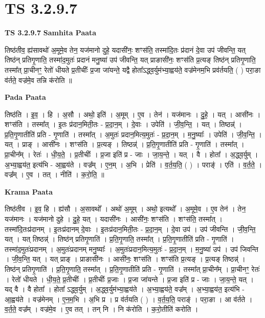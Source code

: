 \documentclass[17pt]{extarticle}
\begin{document}
\section{ TS 3.2.9.7 }

\textbf{TS 3.2.9.7 } \newline
\textbf{Samhita Paata} \newline

तिष्ठ॑तीव॒ ह्य॑सावथो॑ अ॒मूमे॒व तेन॒ यज॑मानो दुहे॒ यदासी॑नः॒ शꣳस॑ति॒ तस्मा॑दि॒तः प्र॑दानं दे॒वा उप॑ जीवन्ति॒ यत् तिष्ठ॑न् प्रतिगृ॒णाति॒ तस्मा॑द॒मुतः॑ प्रदानं मनु॒ष्या॑ उप॑ जीवन्ति॒ यत् प्राङासी॑नः॒ शꣳस॑ति प्र॒त्यङ् तिष्ठ॑न् प्रतिगृ॒णाति॒ तस्मा᳚त् प्रा॒चीनꣳ॒॒ रेतो॑ धीयते प्र॒तीचीः᳚ प्र॒जा जा॑यन्ते॒ यद्वै होता᳚ऽद्ध्व॒र्युम॑भ्या॒ह्वय॑ते॒ वज्र॑मेनम॒भि प्रव॑र्तयति॒ ( ) परा॒ङा व॑र्तते॒ वज्र॑मे॒व तन्नि क॑रोति ॥ \newline

\textbf{Pada Paata} \newline

तिष्ठ॑ति । इ॒व॒ । हि । अ॒सौ । अथो॒ इति॑ । अ॒मूम् । ए॒व । तेन॑ । यज॑मानः । दु॒हे॒ । यत् । आसी॑नः । शꣳस॑ति । तस्मा᳚त् । इ॒तः प्र॑दान॒मिती॒तः - प्र॒दा॒न॒म् । दे॒वाः । उपेति॑ । जी॒व॒न्ति॒ । यत् । तिष्ठन्न्॑ । प्र॒ति॒गृ॒णातीति॑ प्रति - गृ॒णाति॑ । तस्मा᳚त् । अ॒मुतः॑ प्रदान॒मित्य॒मुतः॑ - प्र॒दा॒न॒म् । म॒नु॒ष्याः᳚ । उपेति॑ । जी॒व॒न्ति॒ । यत् । प्राङ् । आसी॑नः । शꣳस॑ति । प्र॒त्यङ् । तिष्ठन्न्॑ । प्र॒ति॒गृ॒णातीति॑ प्रति - गृ॒णाति॑ । तस्मा᳚त् । प्रा॒चीन᳚म् । रेतः॑ । धी॒य॒ते॒ । प्र॒तीचीः᳚ । प्र॒जा इति॑ प्र - जाः । जा॒य॒न्ते॒ । यत् । वै । होता᳚ । अ॒द्ध्व॒र्युम् । अ॒भ्या॒ह्वय॑त॒ इत्य॑भि - आ॒ह्वय॑ते । वज्र᳚म् । ए॒न॒म् । अ॒भि । प्रेति॑ । व॒र्त॒य॒ति॒ ( ) । पराङ्॑ । एति॑ । व॒र्त॒ते॒ । वज्र᳚म् । ए॒व । तत् । नीति॑ । क॒रो॒ति॒ ॥  \newline


\textbf{Krama Paata} \newline

तिष्ठ॑तीव । इ॒व॒ हि । ह्य॑सौ । अ॒सावथो᳚ । अथो॑ अ॒मूम् । अथो॒ इत्यथो᳚ । अ॒मूमे॒व । ए॒व तेन॑ । तेन॒ यज॑मानः । यज॑मानो दुहे । दु॒हे॒ यत् । यदासी॑नः । आसी॑नः॒ शꣳस॑ति । शꣳस॑ति॒ तस्मा᳚त् । तस्मा॑दि॒तःप्र॑दानम् । इ॒तःप्र॑दानम् दे॒वाः । इ॒तःप्र॑दान॒मिती॒तः - प्र॒दा॒न॒म् । दे॒वा उप॑ । उप॑ जीवन्ति । जी॒व॒न्ति॒ यत् । यत् तिष्ठन्न्॑ । तिष्ठ॑न् प्रतिगृ॒णाति॑ । प्र॒ति॒गृ॒णाति॒ तस्मा᳚त् । प्र॒ति॒गृ॒णातीति॑ प्रति - गृ॒णाति॑ । तस्मा॑द॒मुतः॑प्रदानम् । अ॒मुतः॑प्रदानम् मनु॒ष्याः᳚ । अ॒मुतः॑प्रदान॒मित्य॒मुतः॑ - प्र॒दा॒न॒म् । म॒नु॒ष्या॑ उप॑ । उप॑ जिवन्ति । जी॒व॒न्ति॒ यत् । यत् प्राङ् । प्राङासी॑नः । आसी॑नः॒ शꣳस॑ति । शꣳस॑ति प्र॒त्यङ् । प्र॒त्यङ् तिष्ठन्न्॑ । तिष्ठ॑न् प्रतिगृ॒णाति॑ । प्र॒ति॒गृ॒णाति॒ तस्मा᳚त् । प्र॒ति॒गृ॒णातीति॑ प्रति - गृ॒णाति॑ । तस्मा᳚त् प्रा॒चीन᳚म् । प्रा॒चीनꣳ॒॒ रेतः॑ । रेतो॑ धीयते । धी॒य॒ते॒ प्र॒तीचीः᳚ । प्र॒तीचीः᳚ प्र॒जाः । प्र॒जा जा॑यन्ते । प्र॒जा इति॑ प्र - जाः । जा॒य॒न्ते॒ यत् । यद् वै । वै होता᳚ । होता᳚ ऽद्ध्व॒र्युम् । अ॒द्ध्व॒र्युम॑भ्या॒ह्वय॑ते । अ॒भ्या॒ह्वय॑ते॒ वज्र᳚म् । अ॒भ्या॒ह्वय॑त॒ इत्य॑भि - आ॒ह्वय॑ते । वज्र॑मेनम् । ए॒न॒म॒भि । अ॒भि प्र । प्र व॑र्तयति ( ) । व॒र्त॒य॒ति॒ पराङ्॑ । परा॒ङा । आ व॑र्तते । व॒र्त॒ते॒ वज्र᳚म् । वज्र॑मे॒व । ए॒व तत् । तन् नि । नि क॑रोति । क॒रो॒तीति॑ करोति । \newline
\end{document}
